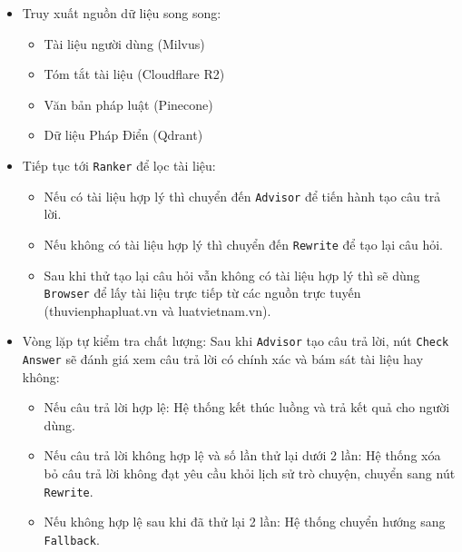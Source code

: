 \begin{itemize}
\item Truy xuất nguồn dữ liệu song song:
\begin{itemize}
\item Tài liệu người dùng (Milvus)
\item Tóm tắt tài liệu (Cloudflare R2)
\item Văn bản pháp luật (Pinecone)
\item Dữ liệu Pháp Điển (Qdrant)
\end{itemize}

\item Tiếp tục tới \texttt{Ranker} để lọc tài liệu:
\begin{itemize}
\item Nếu có tài liệu hợp lý thì chuyển đến \texttt{Advisor} để tiến hành tạo câu trả lời.
\item Nếu không có tài liệu hợp lý thì chuyển đến \texttt{Rewrite} để tạo lại câu hỏi.
\item Sau khi thử tạo lại câu hỏi vẫn không có tài liệu hợp lý thì sẽ dùng \texttt{Browser} để lấy tài liệu trực tiếp từ các nguồn trực tuyến (thuvienphapluat.vn và luatvietnam.vn).
\end{itemize}

\item Vòng lặp tự kiểm tra chất lượng:
Sau khi \texttt{Advisor} tạo câu trả lời, nút \texttt{Check Answer} sẽ đánh giá xem câu trả lời có chính xác và bám sát tài liệu hay không:
\begin{itemize}
\item Nếu câu trả lời hợp lệ: Hệ thống kết thúc luồng và trả kết quả cho người dùng.
\item Nếu câu trả lời không hợp lệ và số lần thử lại dưới 2 lần: Hệ thống xóa bỏ câu trả lời không đạt yêu cầu khỏi lịch sử trò chuyện, chuyển sang nút \texttt{Rewrite}.
\item Nếu không hợp lệ sau khi đã thử lại 2 lần:
Hệ thống chuyển hướng sang \texttt{Fallback}.
\end{itemize}


\end{itemize}

